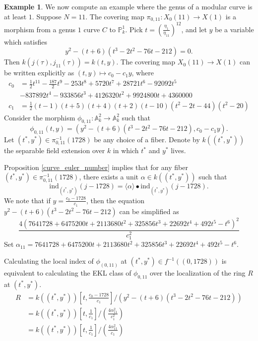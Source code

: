 \documentclass[12pt, reqno]{amsart}
\theoremstyle{definition}
\newtheorem{example}[theorem]{Example}
\newcommand{\A}{\mathbb{A}} %
\newcommand{\Proj}{\mathbb{P}} %
\newcommand{\ind}{\mathrm{ind}} %
\begin{document}
\begin{example}
We now compute an example where the genus of a modular curve is at least $1$. Suppose $N = 11$. The covering map $\pi_{0, 11}: X_0(11) \to X(1)$ is a morphism from a genus $1$ curve $C$ to $\Proj_k^1$. Pick $t = \left( \frac{\eta_1}{\eta_{11}} \right)^{12}$, and let $y$ be a variable which satisfies
\begin{equation*}
    y^2 - (t+6)(t^3-2t^2-76t-212) = 0.
\end{equation*}
Then $k(j(\tau), j_{11}(\tau)) = k(t, y)$. The covering map $X_0(11) \to X(1)$ can be written explicitly as $(t,y) \mapsto c_0 - c_1 y$, where
\begin{align*}
    c_0 &= \frac{1}{2}t^{11} - \frac{187}{2}t^9 - 253 t^8 + 5720 t^7 + 28721 t^6 - 92092 t^5 \\
    &- 837892 t^4 - 933856 t^3 + 4126320 t^2 + 9924800 t + 4360000\\
    c_1 &= \frac{1}{2}(t-1)(t+5)(t+4)(t+2)(t-10)(t^2-2t-44)(t^2-20)
\end{align*}
Consider the morphism $\phi_{0, 11}: \A_k^2 \to \A_k^2$ such that 
\begin{equation*}
    \phi_{0,11}(t,y) = (y^2 - (t+6)(t^3-2t^2-76t-212), c_0 - c_1 y).
\end{equation*}
Let $(t^*, y^*) \in \pi_{0, 11}^{-1}(1728)$ be any choice of a fiber. Denote by $k((t^*, y^*))$ the separable field extension over $k$ in which $t^*$ and $y^*$ lives.

Proposition \ref{curve_euler_number} implies that for any fiber $(t^*, y^*) \in \pi_{0, 11}^{-1}(1728)$, there exists a unit $\alpha \in k((t^*, y^*))$ such that
\begin{equation*}
    \ind_{(t^*, y^*)} (j-1728) = \langle \alpha \rangle \bullet \ind_{(t^*, y^*)} (j-1728).
\end{equation*}
We note that if $y = \frac{c_0 - 1728}{c_1}$, then the equation $y^2 - (t+6)(t^3 - 2t^2 - 76t - 212)$ can be simplified as
\begin{equation*}
    \frac{4(7641728 + 6475200t + 2113680t^2 + 325856 t^3 + 22692 t^4 + 492t^5 - t^6)^2}{c_1^2}
\end{equation*}
Set $\alpha_{11} = 7641728 + 6475200t + 2113680t^2 + 325856 t^3 + 22692 t^4 + 492t^5 - t^6$. 

Calculating the local index of $\phi_{(0,11)}$ at $(t^*, y^*) \in f^{-1}((0, 1728))$ is equivalent to calculating the EKL class of $\phi_{0, 11}$ over the localization of the ring $R$ at $(t^*, y^*)$.
\begin{align*}
    R &= k((t^*, y^*)) \left[ t, \frac{c_0 - 1728}{c_1} \right] / (y^2 - (t+6)(t^3 - 2t^2 - 76t - 212)) \\
    &= k((t^*, y^*)) \left[ t, \frac{1}{c_1} \right] / \left( \frac{4 \alpha_{11}^2}{c_1^2} \right) \\
    &= k((t^*, y^*)) \left[ t, \frac{1}{c_1} \right] / \left( \frac{4 \alpha_{11}^2}{c_1} \right)
\end{align*}


\end{example}
\end{document}
